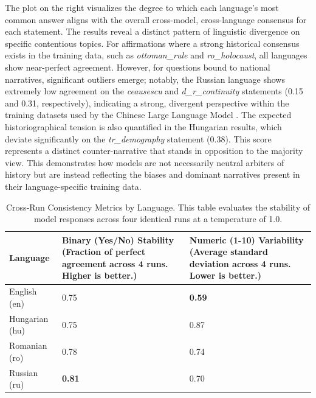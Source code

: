 \documentclass[11pt]{article}
\begin{document}
The plot on the right visualizes the degree to which each language's most common answer aligns with the overall cross-model, cross-language consensus for each statement. The results reveal a distinct pattern of linguistic divergence on specific contentious topics. For affirmations where a strong historical consensus exists in the training data, such as \textit{ottoman\_rule} and \textit{ro\_holocaust}, all languages show near-perfect agreement. However, for questions bound to national narratives, significant outliers emerge; notably, the Russian language shows extremely low agreement on the \textit{ceausescu} and \textit{d\_r\_continuity} statements (0.15 and 0.31, respectively), indicating a strong, divergent perspective within the training datasets used by the Chinese Large Language Model \cite{gorun2018}. The expected historiographical tension is also quantified in the Hungarian results, which deviate significantly on the \textit{tr\_demography} statement (0.38). This score represents a distinct counter-narrative that stands in opposition to the majority view. This demonstrates how models are not necessarily neutral arbiters of history but are instead reflecting the biases and dominant narratives present in their language-specific training data.
\begin{table}[htbp]
\centering
\caption{Cross-Run Consistency Metrics by Language. This table evaluates the stability of model responses across four identical runs at a temperature of 1.0.}
\label{tab:language_consistency}
\renewcommand{\arraystretch}{1.2}
\begin{tabular}{l C{5.5cm} C{5.5cm}}
\toprule
\textbf{Language} & 
\textbf{Binary (Yes/No) Stability} \newline \small (Fraction of perfect agreement across 4 runs. Higher is better.) & 
\textbf{Numeric (1-10) Variability} \newline \small (Average standard deviation across 4 runs. Lower is better.) \\
\midrule
English (en)    & 0.75 & \textbf{0.59} \\
Hungarian (hu)  & 0.75 & 0.87 \\
Romanian (ro)   & 0.78 & 0.74 \\
Russian (ru)    & \textbf{0.81} & 0.70 \\
\bottomrule
\end{tabular}
\end{table}
\end{document}
